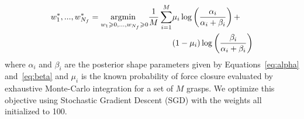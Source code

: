 \begin{align*}
	w_1^*, ..., w_{N_f}^* = \underset{w_1 \geqslant 0, ..., w_{N_f} \geqslant 0}{\text{argmin }} \frac{1}{M} \sum \limits_{i=1}^M &\mu_i \log \left( \frac{\alpha_i}{\alpha_i + \beta_i} \right) + \\  &(1 - \mu_i) \log \left( \frac{\beta_i}{\alpha_i + \beta_i} \right)
\end{align*}
\noindent where $\alpha_i$ and $\beta_i$ are the posterior shape parameters given by Equations~\ref{eq:alpha} and~\ref{eq:beta} and $\mu_i$ is the known probability of force closure evaluated by exhaustive Monte-Carlo integration for a set of $M$ grasps.
We optimize this objective using Stochastic Gradient Descent (SGD) with the weights all initialized to 100.